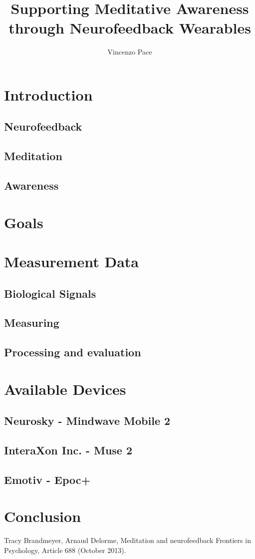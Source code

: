 \documentclass{llncs} %
\begin{document}
\title{Supporting Meditative Awareness through Neurofeedback Wearables}
\author{Vincenzo Pace}
\maketitle
\newpage
\section{Introduction}
\subsection{Neurofeedback}
\subsection{Meditation}
\subsection{Awareness}
\section{Goals}
\section{Measurement Data}
\subsection{Biological Signals}
\subsection{Measuring}
\subsection{Processing and evaluation}
\section{Available Devices}
\subsection{Neurosky - Mindwave Mobile 2}
\subsection{InteraXon Inc. - Muse 2}
\subsection{Emotiv - Epoc+}
\section{Conclusion}


\begin{thebibliography}{[MT1]}
    Tracy Brandmeyer, Arnaud Delorme,
    Meditation and neurofeedback
    Frontiers in Psychology, Article 688 (October 2013).
    \end{thebibliography}
\end{document}
